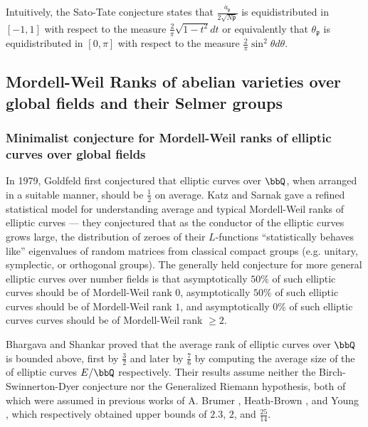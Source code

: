 Intuitively, the Sato-Tate conjecture states that $\frac{a_\mathfrak{p}}{2\sqrt{N\mathfrak{p}}}$ is equidistributed in $[-1,1]$ with respect to the measure $\frac{2}{\pi}\sqrt{1-t^2}dt$ or equivalently that $\theta_{\mathfrak{p}}$ is equidistributed in $[0,\pi]$ with respect to the measure $\frac{2}{\pi} \sin^2 \theta d\theta$.

\subsection{Mordell-Weil Ranks of abelian varieties over global fields and their Selmer groups}

\subsubsection{Minimalist conjecture for Mordell-Weil ranks of elliptic curves over global fields}



In 1979, Goldfeld \cite{goldfeld_cecqf} first conjectured that elliptic curves over $\bbQ$, when arranged in a suitable manner, should be $\frac{1}{2}$ on average. Katz and Sarnak \cite{katz_rmfem} gave a refined statistical model for understanding average and typical Mordell-Weil ranks of elliptic curves --- they conjectured that as the conductor of the elliptic curves grows large, the distribution of zeroes of their $L$-functions ``statistically behaves like'' eigenvalues of random matrices from classical compact groups (e.g. unitary, symplectic, or orthogonal groups). The generally held conjecture for more general elliptic curves over number fields is that asymptotically $50\%$ of such elliptic curves should be of Mordell-Weil rank $0$, asymptotically $50\%$ of such elliptic curves should be of Mordell-Weil rank $1$, and asymptotically $0\%$ of such elliptic curves curves should be of Mordell-Weil rank $\geq 2$.




Bhargava and Shankar proved that the average rank of elliptic curves over $\bbQ$ is bounded above, first by $\frac{3}{2}$ \cite{bhargava_shankar_bqfhbibarec} and later by $\frac{7}{6}$ \cite{bhargava_shankar_tcfhbieppecr0} by computing the average size of the  of elliptic curves $E/\bbQ$ respectively. Their results assume neither the Birch-Swinnerton-Dyer conjecture nor the Generalized Riemann hypothesis, both of which were assumed in previous works of A. Brumer \cite{brumer_arecI}, Heath-Brown \cite{heath-brown_aarec}, and Young \cite{young_llzfec}, which respectively obtained upper bounds of $2.3$, $2$, and $\frac{25}{14}$.

